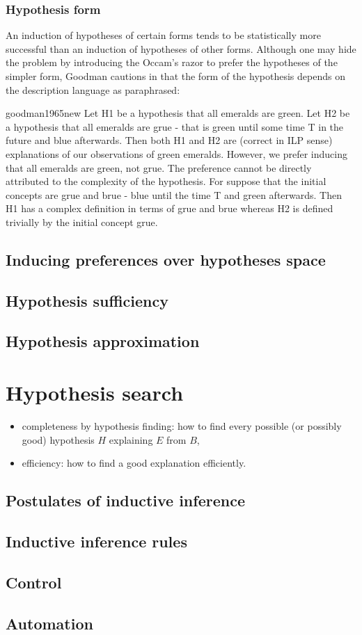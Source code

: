 \subsubsection{Hypothesis form}
An induction of hypotheses of certain forms tends to be statistically more successful than an induction of hypotheses of other forms.
Although one may hide the problem by introducing the Occam's razor to prefer the hypotheses of the simpler form, Goodman cautions in \cite{goodman1965new} that the form of the hypothesis depends on the description language as paraphrased:

\begin{cite}{goodman1965new}
Let H1 be a hypothesis that all emeralds are green. Let H2 be a hypothesis that all emeralds are grue - that is green until some time T in the future and blue afterwards. Then both H1 and H2 are (correct in ILP sense) explanations of our observations of green emeralds. However, we prefer inducing that all emeralds are green, not grue. The preference cannot be directly attributed to the complexity of the hypothesis. For suppose that the initial concepts are grue and brue - blue until the time T and green afterwards. Then H1 has a complex definition in terms of grue and brue whereas H2 is defined trivially by the initial concept grue.
\end{cite}

\subsection{Inducing preferences over hypotheses space}
\subsection{Hypothesis sufficiency}
\subsection{Hypothesis approximation}

\section{Hypothesis search}
\begin{itemize}
\item completeness by hypothesis finding: how to find every possible (or possibly good) hypothesis $H$ explaining $E$ from $B$,
\item efficiency: how to find a good explanation efficiently. 
\end{itemize}
\subsection{Postulates of inductive inference}
\subsection{Inductive inference rules}
\subsection{Control}
\subsection{Automation}